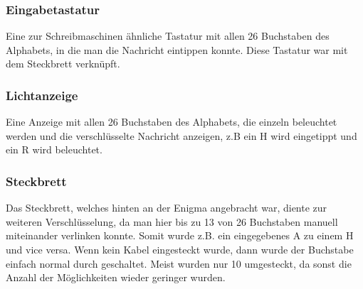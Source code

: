 \subsubsection{Eingabetastatur}
Eine zur Schreibmaschinen ähnliche Tastatur mit allen 26 Buchstaben des Alphabets, in die man die Nachricht eintippen konnte. Diese Tastatur war mit dem Steckbrett verknüpft.

\subsubsection{Lichtanzeige}
Eine Anzeige mit allen 26 Buchstaben des Alphabets, die einzeln beleuchtet werden und die verschlüsselte Nachricht anzeigen, z.B ein H wird eingetippt und ein R wird beleuchtet.

\subsubsection{Steckbrett}
\label{sec:steck}
Das Steckbrett, welches hinten an der Enigma angebracht war, diente zur weiteren Verschlüsselung, da man hier bis zu 13 von 26 Buchstaben manuell miteinander verlinken konnte. Somit wurde z.B. ein eingegebenes A zu einem H und vice versa. Wenn kein Kabel eingesteckt wurde, dann wurde der Buchstabe einfach normal durch geschaltet. Meist wurden nur 10 umgesteckt, da sonst die Anzahl der Möglichkeiten wieder geringer wurden.

